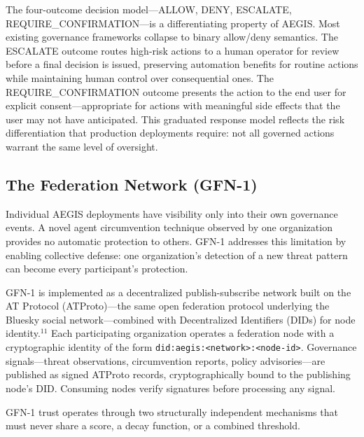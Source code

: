 \documentclass{IEEEcsmag}
\begin{document}
The four-outcome decision model---ALLOW, DENY, ESCALATE, REQUIRE\_CONFIRMATION---is a differentiating property of AEGIS. Most existing governance frameworks collapse to binary allow/deny semantics. The ESCALATE outcome routes high-risk actions to a human operator for review before a final decision is issued, preserving automation benefits for routine actions while maintaining human control over consequential ones. The REQUIRE\_CONFIRMATION outcome presents the action to the end user for explicit consent---appropriate for actions with meaningful side effects that the user may not have anticipated. This graduated response model reflects the risk differentiation that production deployments require: not all governed actions warrant the same level of oversight.

\subsection{The Federation Network (GFN-1)}

Individual AEGIS deployments have visibility only into their own governance events. A novel agent circumvention technique observed by one organization provides no automatic protection to others. GFN-1 addresses this limitation by enabling collective defense: one organization's detection of a new threat pattern can become every participant's protection.

GFN-1 is implemented as a decentralized publish-subscribe network built on the AT Protocol (ATProto)---the same open federation protocol underlying the Bluesky social network---combined with Decentralized Identifiers (DIDs) for node identity.$^{11}$ Each participating organization operates a federation node with a cryptographic identity of the form \texttt{did:aegis:<network>:<node-id>}. Governance signals---threat observations, circumvention reports, policy advisories---are published as signed ATProto records, cryptographically bound to the publishing node's DID. Consuming nodes verify signatures before processing any signal.

GFN-1 trust operates through two structurally independent mechanisms that must never share a score, a decay function, or a combined threshold.
\end{document}

